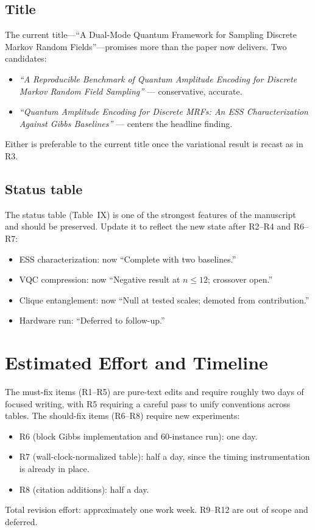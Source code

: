 \documentclass[conference,10pt]{IEEEtran}
\begin{document}
\subsection{Title}

The current title---``A Dual-Mode Quantum Framework for Sampling
Discrete Markov Random Fields''---promises more than the paper now
delivers. Two candidates:
\begin{itemize}[leftmargin=*]
    \item \emph{``A Reproducible Benchmark of Quantum Amplitude Encoding for
    Discrete Markov Random Field Sampling''} --- conservative, accurate.
    \item \emph{``Quantum Amplitude Encoding for Discrete MRFs: An ESS
    Characterization Against Gibbs Baselines''} --- centers the headline
    finding.
\end{itemize}
Either is preferable to the current title once the variational result
is recast as in R3.

\subsection{Status table}

The status table (Table~IX) is one of the strongest features of the
manuscript and should be preserved. Update it to reflect the new state
after R2--R4 and R6--R7:
\begin{itemize}[leftmargin=*]
    \item ESS characterization: now ``Complete with two baselines.''
    \item VQC compression: now ``Negative result at $n \le 12$; crossover
    open.''
    \item Clique entanglement: now ``Null at tested scales; demoted from
    contribution.''
    \item Hardware run: ``Deferred to follow-up.''
\end{itemize}

\section{Estimated Effort and Timeline}

The must-fix items (R1--R5) are pure-text edits and require roughly
two days of focused writing, with R5 requiring a careful pass to
unify conventions across tables. The should-fix items (R6--R8)
require new experiments:
\begin{itemize}[leftmargin=*]
    \item R6 (block Gibbs implementation and 60-instance run): one day.
    \item R7 (wall-clock-normalized table): half a day, since the timing
    instrumentation is already in place.
    \item R8 (citation additions): half a day.
\end{itemize}
Total revision effort: approximately one work week. R9--R12 are
out of scope and deferred.
\end{document}
